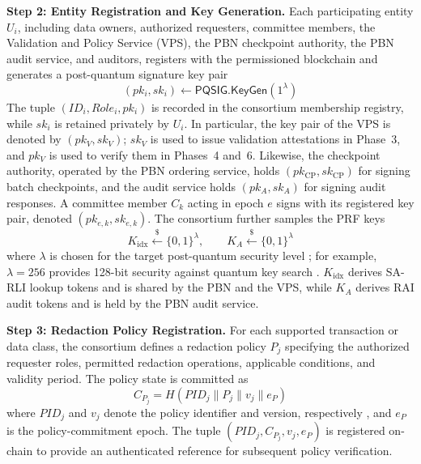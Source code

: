 \documentclass[lettersize,journal]{IEEEtran}
\begin{document}
    \textbf{Step 2: Entity Registration and Key Generation.}
    Each participating entity $U_i$, including data owners, authorized
    requesters, committee members,  {the Validation and Policy
    Service (VPS),}  {the PBN checkpoint authority, the PBN
    audit service,} and auditors, registers with the
    permissioned blockchain and generates a post-quantum signature key pair
    \begin{equation}
    (pk_i,sk_i)\leftarrow
    \mathsf{PQSIG.KeyGen}(1^\lambda)
    \end{equation}
    The tuple $(ID_i,Role_i,pk_i)$ is recorded in the consortium
    membership registry, while $sk_i$ is retained privately by $U_i$.
     {In particular, the key pair of the VPS is denoted by
    $(pk_V,sk_V)$; $sk_V$ is used to issue validation attestations in
    Phase~3, and $pk_V$ is used to verify them in Phases~4 and~6.}
     {Likewise, the checkpoint authority, operated by the PBN
    ordering service, holds $(pk_{\mathrm{CP}},sk_{\mathrm{CP}})$ for signing
    batch checkpoints, and the audit service holds $(pk_A,sk_A)$ for signing
    audit responses. A committee member $C_k$ acting in epoch $e$ signs with
    its registered key pair, denoted $(pk_{e,k},sk_{e,k})$. The consortium
    further samples the PRF keys
    \begin{equation}
    K_{\mathrm{idx}}\stackrel{\$}{\leftarrow}\{0,1\}^{\lambda},\qquad
    K_A\stackrel{\$}{\leftarrow}\{0,1\}^{\lambda}
    \end{equation}
      {where $\lambda$ is chosen for the target
    post-quantum security level} {; for example, $\lambda=256$ provides
    128-bit security against quantum key search} {.} $K_{\mathrm{idx}}$ derives SA-RLI lookup
    tokens and is shared by the PBN and the VPS, while $K_A$ derives RAI audit
    tokens and is held by the PBN audit service.}
    
    \textbf{Step 3: Redaction Policy Registration.}
    For each supported transaction or data class, the consortium defines
    a redaction policy $P_j$ specifying the authorized requester roles,
    permitted redaction operations, applicable conditions, and validity
    period. The policy state is committed as
    \begin{equation}
    {C_{P_j}=H(PID_j\parallel P_j\parallel v_j\parallel e_P)}
    \end{equation}
    where $PID_j$ and $v_j$ denote the policy identifier and version,
    respectively {, and $e_P$ is the policy-commitment epoch}. The tuple $(PID_j,C_{P_j},v_j, {e_P})$ is registered on-chain
    to provide an authenticated reference for subsequent policy
    verification.
    
\end{document}
